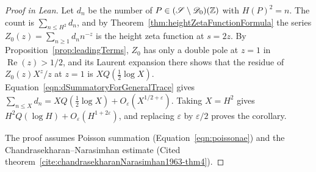 \begin{proof}[Proof in Lean]

\leanok


Let $d_n$ be the number of $P\in(\mathscr{S}\setminus\mathscr{D}_0)(\mathbb{Z})$ with $H(P)^2=n$. The count is $\sum_{n\leq H^2}d_n$, and by Theorem~\ref{thm:heightZetaFunctionFormula} the series $Z_0(z)=\sum_{n\geq1}d_nn^{-z}$ is the height zeta function at $s=2z$. By Proposition~\ref{prop:leadingTerms}, $Z_0$ has only a double pole at $z=1$ in $\operatorname{Re}(z)>1/2$, and its Laurent expansion there shows that the residue of $Z_0(z)X^z/z$ at $z=1$ is $XQ(\tfrac12\log X)$. Equation~\ref{eqn:dSummatoryForGeneralTrace} gives $\sum_{n\leq X}d_n=XQ(\tfrac12\log X)+O_\varepsilon(X^{1/2+\varepsilon})$. Taking $X=H^2$ gives $H^2Q(\log H)+O_\varepsilon(H^{1+2\varepsilon})$, and replacing $\varepsilon$ by $\varepsilon/2$ proves the corollary.

The proof assumes Poisson summation (Equation~\ref{eqn:poissonae}) and the Chandrasekharan--Narasimhan estimate (Cited theorem~\ref{cite:chandrasekharanNarasimhan1963-thm4}).

\end{proof}

